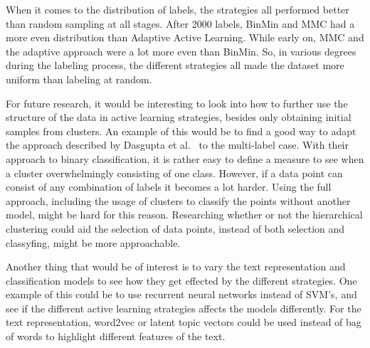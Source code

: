 When it comes to the distribution of labels, the strategies all performed better than random sampling at all stages.
After 2000 labels, BinMin and MMC had a more even distribution than Adaptive Active Learning.
While early on, MMC and the adaptive approach were a lot more even than BinMin.
So, in various degrees during the labeling process, the different strategies all made the dataset more uniform than labeling at random.

For future research, it would be interesting to look into how to further use the structure of the data in active learning strategies, besides only obtaining initial samples from clusters.
An example of this would be to find a good way to adapt the approach described by Dasgupta et al\@.~\cite{dasgupta2008hierarchical} to the multi-label case.
With their approach to binary classification, it is rather easy to define a measure to see when a cluster overwhelmingly consisting of one class.
However, if a data point can consist of any combination of labels it becomes a lot harder.
Using the full approach, including the usage of clusters to classify the points without another model, might be hard for this reason.
Researching whether or not the hierarchical clustering could aid the selection of data points, instead of both selection and classyfing, might be more approachable.

Another thing that would be of interest is to vary the text representation and classification models to see how they get effected by the different strategies.
One example of this could be to use recurrent neural networks instead of SVM's, and see if the different active learning strategies affects the models differently.
For the text representation, word2vec or latent topic vectors could be used instead of bag of words to highlight different features of the text.